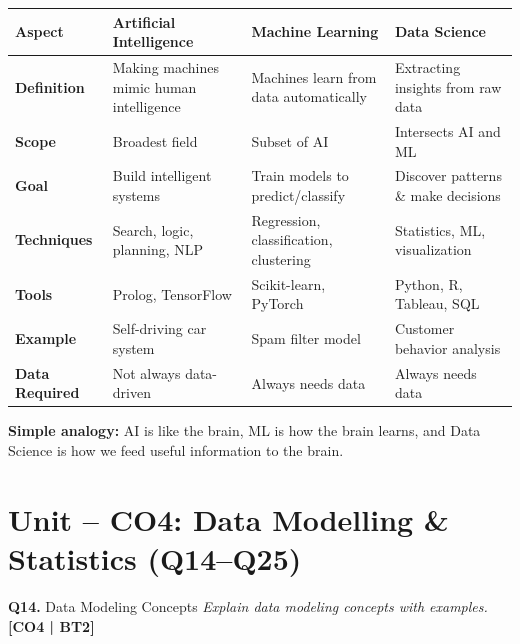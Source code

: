 \documentclass[12pt,a4paper]{article}
\newcommand{\Qno}[1]{\textbf{\color{darkred}Q#1.}}
\begin{document}
\begin{answerenv}

\begin{center}
\begin{tabular}{>{\bfseries}p{2.8cm} p{3.5cm} p{3.5cm} p{3.5cm}}
\toprule
\textbf{Aspect} & \textbf{Artificial Intelligence} & \textbf{Machine Learning} & \textbf{Data Science} \\
\midrule
Definition & Making machines mimic human intelligence & Machines learn from data automatically & Extracting insights from raw data \\[4pt]
Scope & Broadest field & Subset of AI & Intersects AI and ML \\[4pt]
Goal & Build intelligent systems & Train models to predict/classify & Discover patterns \& make decisions \\[4pt]
Techniques & Search, logic, planning, NLP & Regression, classification, clustering & Statistics, ML, visualization \\[4pt]
Tools & Prolog, TensorFlow & Scikit-learn, PyTorch & Python, R, Tableau, SQL \\[4pt]
Example & Self-driving car system & Spam filter model & Customer behavior analysis \\[4pt]
Data Required & Not always data-driven & Always needs data & Always needs data \\
\bottomrule
\end{tabular}
\end{center}

\begin{keypoint}
\textbf{Simple analogy:} AI is like the brain, ML is how the brain learns, and Data Science is how we feed useful information to the brain.
\end{keypoint}

\end{answerenv}

\newpage

\section{Unit -- CO4: Data Modelling \& Statistics (Q14--Q25)}

\begin{questionbox}{\Qno{14} Data Modeling Concepts}
\textit{Explain data modeling concepts with examples.} \hfill \textbf{[CO4 | BT2]}
\end{questionbox}
\end{document}

